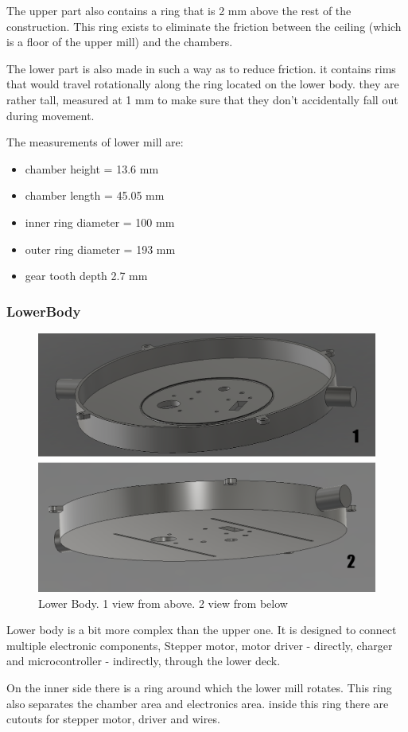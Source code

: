 The upper part also contains a ring that is 2 mm above the rest of the construction. This ring exists to eliminate the friction between the ceiling (which is a floor of the upper mill) and the chambers. 

The lower part is also made in such a way as to reduce friction. it contains rims that would travel rotationally along the ring located on the lower body. they are rather tall, measured at 1 mm to make sure that they don't accidentally fall out during movement.

The measurements of lower mill are:
\begin{itemize}
	\item chamber height = 13.6 mm
	\item chamber length = 45.05 mm
	\item inner ring diameter = 100 mm
	\item outer ring diameter = 193 mm
	\item gear tooth depth 2.7 mm
\end{itemize}
\newpage
\subsubsection{LowerBody}
\begin{figure}[h]
	\centering
	\includegraphics[width=0.7\linewidth]{Figures/Lowerbody}
	\caption[Lower Body]{Lower Body. 1 view from above. 2 view from below}
	\label{fig:lowerbody}
\end{figure}
Lower body is a bit more complex than the upper one. It is designed to connect multiple electronic components, Stepper motor, motor driver - directly, charger and microcontroller - indirectly, through the lower deck.

On the inner side there is a ring around which the lower mill rotates. This ring also separates the chamber area and electronics area. inside this ring there are cutouts for stepper motor, driver and wires.

